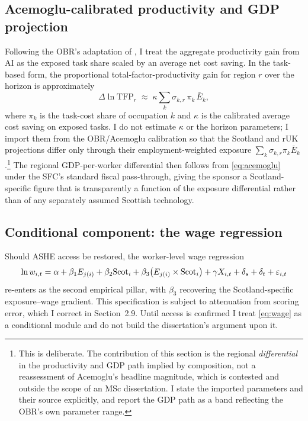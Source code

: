 \subsection{Acemoglu-calibrated productivity and GDP projection}

Following the OBR's adaptation \citep{obr2026} of \citet{acemoglu2024macroAI}, I treat the aggregate productivity gain from AI as the exposed task share scaled by an average net cost saving. In the task-based form, the proportional total-factor-productivity gain for region $r$ over the horizon is approximately
\begin{equation}
\Delta\ln \mathrm{TFP}_r \;\approx\; \kappa\sum_k \sigma_{k,r}\,\pi_k\,\bar E_k,
\label{eq:acemoglu}
\end{equation}
where $\pi_k$ is the task-cost share of occupation $k$ and $\kappa$ is the calibrated average cost saving on exposed tasks. I do not estimate $\kappa$ or the horizon parameters; I import them from the OBR/Acemoglu calibration so that the Scotland and rUK projections differ only through their employment-weighted exposure $\sum_k\sigma_{k,r}\pi_k\bar E_k$.\footnote{This is deliberate. The contribution of this section is the regional \emph{differential} in the productivity and GDP path implied by composition, not a reassessment of Acemoglu's headline magnitude, which is contested and outside the scope of an MSc dissertation. I state the imported parameters and their source explicitly, and report the GDP path as a band reflecting the OBR's own parameter range.} The regional GDP-per-worker differential then follows from \eqref{eq:acemoglu} under the SFC's standard fiscal pass-through, giving the sponsor a Scotland-specific figure that is transparently a function of the exposure differential rather than of any separately assumed Scottish technology.

\subsection{Conditional component: the wage regression}

Should ASHE access be restored, the worker-level wage regression
\begin{equation}
\ln w_{i,t}=\alpha+\beta_1 E_{j(i)}+\beta_2\mathrm{Scot}_i+\beta_3\big(E_{j(i)}\times\mathrm{Scot}_i\big)+\gamma X_{i,t}+\delta_s+\delta_t+\varepsilon_{i,t}
\label{eq:wage}
\end{equation}
re-enters as the second empirical pillar, with $\beta_3$ recovering the Scotland-specific exposure--wage gradient. This specification is subject to attenuation from scoring error, which I correct in Section~2.9. Until access is confirmed I treat \eqref{eq:wage} as a conditional module and do not build the dissertation's argument upon it.

